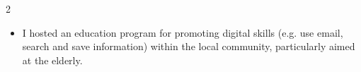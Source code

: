 \documentclass[10pt,a4paper,ragged2e,withhyper]{altacv}
\begin{document}
\begin{paracol}{2}

\medskip




\begin{itemize}
	\item I hosted an education program for promoting digital skills (e.g. use email, search and save information) within the local community, particularly aimed at the elderly.
\end{itemize}

\medskip



\nocite{*}

\printbibliography[heading=pubtype,title={\printinfo{\faBook}{Student papers}},type=book]

\newpage


\switchcolumn


\end{paracol}
\end{document}
